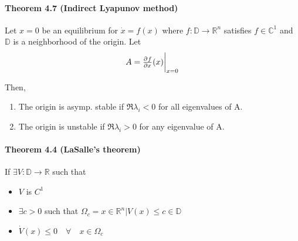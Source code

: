 \paragraph{Theorem 4.7 (Indirect Lyapunov method)}
Let $x=0$ be an equilibrium for $\dot{x} = f(x)$ where $f : \mathbb{D} \rightarrow \mathbb{R}^n$ satisfies $f \in \mathbb{C}^1$ and $\mathbb{D}$ is a neighborhood of the origin. Let
\begin{equation}
	A = \pd{f}{x} (x) \evalat{x=0}
\end{equation}

Then,
\begin{enumerate}
	\item The origin is asymp. stable if $\Re \lambda_i < 0$ for all eigenvalues of A.
	\item The origin is unstable if $\Re \lambda_i > 0$ for any eigenvalue of A.
\end{enumerate}

\paragraph{Theorem 4.4 (LaSalle's theorem)}
If $\exists V : \mathbb{D} \rightarrow \mathbb{R}$ such that
\begin{itemize}
	\item $V$ is $C^1$
	\item $\exists c > 0$ such that $\Omega_c = {x \in \mathbb{R}^n | V(x) \leq c} \in \mathbb{D}$ 
	\item $\dot{V}(x) \leq 0 \quad \forall \quad x \in \Omega_c$
\end{itemize}
